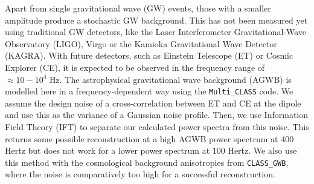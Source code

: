 Apart from single gravitational wave (GW) events, those with a smaller amplitude produce a stochastic GW background. This has not been measured yet using traditional GW detectors, like the Laser Interferometer Gravitational-Wave Observatory (LIGO), Virgo or the Kamioka Gravitational Wave Detector (KAGRA). With future detectors, such as Einstein Telescope (ET) or Cosmic Explorer (CE), it is expected to be observed in the frequency range of $\approx 10-10^4$ Hz.  The astrophysical gravitational wave background (AGWB) is modelled here in a frequency-dependent way using the {\tt Multi\_CLASS} code. We assume the design noise of a cross-correlation between ET and CE at the dipole and use this as the variance of a Gaussian noise profile. Then, we use Information Field Theory (IFT) to separate our calculated power spectra from this noise. This returns some possible reconstruction at a high AGWB power spectrum at 400 Hertz but does not work for a lower power spectrum at 100 Hertz. We also use this method with the cosmological background anisotropies from {\tt CLASS\_GWB}, where the noise is comparatively too high for a successful reconstruction.
